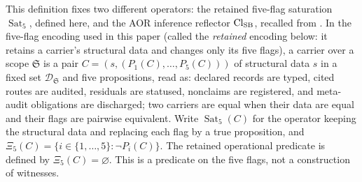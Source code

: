 \begin{definition}\label{def:reflective-closure}
This definition fixes two different operators: the retained five-flag saturation \(\operatorname{Sat}_5\), defined here, and the AOR inference reflector \(\mathrm{Cl}_{\mathrm{SB}}\), recalled from \citet{Tsiokos2026AOR}.
In the five-flag encoding used in this paper (called the \emph{retained} encoding below: it retains a carrier's structural data and changes only its five flags), a carrier over a scope \(\mathfrak S\) is a pair
\(C=(s,(P_1(C),\ldots,P_5(C)))\) of structural data \(s\) in a fixed set
\(\mathcal D_{\mathfrak S}\) and five propositions, read as: declared records are
typed, cited routes are audited, residuals are statused, nonclaims are
registered, and meta-audit obligations are discharged; two carriers are equal
when their data are equal and their flags are pairwise equivalent.
Write \(\operatorname{Sat}_5(C)\) for the operator keeping the structural
data and replacing each flag by a true proposition, and
\(\Xi_5(C)=\{i\in\{1,\ldots,5\}:\neg P_i(C)\}\).
The retained operational predicate is defined by \(\Xi_5(C)=\varnothing\).
This is a predicate on the five flags, not a construction of witnesses.


\end{definition}
